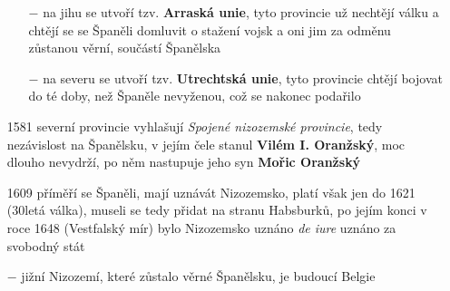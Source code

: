 \documentclass{article}
\begin{document}
\begin{itemize}
\begin{itemize}
        \item[$-$] na jihu se utvoří tzv. \textbf{Arraská unie}, tyto provincie už nechtějí válku a chtějí se se Španěli domluvit o stažení vojsk a oni jim za odměnu zůstanou věrní, součástí Španělska
        \item[$-$] na severu se utvoří tzv. \textbf{Utrechtská unie}, tyto provincie chtějí bojovat do té doby, než Španěle nevyženou, což se nakonec podařilo
    \end{itemize}
    \item[1581] severní provincie vyhlašují \textit{Spojené nizozemské provincie}, tedy nezávislost na Španělsku, v jejím čele stanul \textbf{Vilém I. Oranžský}, moc dlouho nevydrží, po něm nastupuje jeho syn \textbf{Mořic Oranžský}
    \item[1609] příměří se Španěli, mají uznávát Nizozemsko, platí však jen do 1621 (30letá válka), museli se tedy přidat na stranu Habsburků, po jejím konci v roce 1648 (Vestfalský mír) bylo Nizozemsko uznáno \textit{de iure} uznáno za svobodný stát
    \item[$-$] jižní Nizozemí, které zůstalo věrné Španělsku, je budoucí Belgie
\end{itemize}
\end{document}
